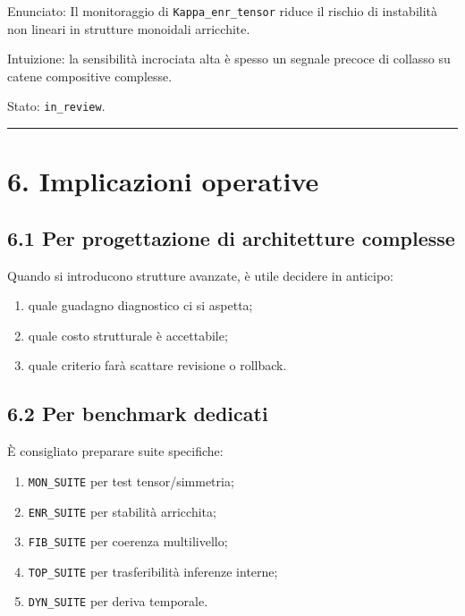 Enunciato:
Il monitoraggio di \texttt{Kappa\_enr\_tensor} riduce il rischio di instabilità non lineari in strutture monoidali arricchite.

Intuizione:
la sensibilità incrociata alta è spesso un segnale precoce di collasso su catene compositive complesse.

Stato: \texttt{in\_review}.

\begin{center}\rule{0.5\linewidth}{0.5pt}\end{center}

\section{6. Implicazioni operative}

\subsection{6.1 Per progettazione di architetture complesse}

Quando si introducono strutture avanzate, è utile decidere in anticipo:

\begin{enumerate}
\def\labelenumi{\arabic{enumi}.}
\tightlist
\item
  quale guadagno diagnostico ci si aspetta;
\item
  quale costo strutturale è accettabile;
\item
  quale criterio farà scattare revisione o rollback.
\end{enumerate}

\subsection{6.2 Per benchmark dedicati}

È consigliato preparare suite specifiche:

\begin{enumerate}
\def\labelenumi{\arabic{enumi}.}
\tightlist
\item
  \texttt{MON\_SUITE} per test tensor/simmetria;
\item
  \texttt{ENR\_SUITE} per stabilità arricchita;
\item
  \texttt{FIB\_SUITE} per coerenza multilivello;
\item
  \texttt{TOP\_SUITE} per trasferibilità inferenze interne;
\item
  \texttt{DYN\_SUITE} per deriva temporale.
\end{enumerate}

